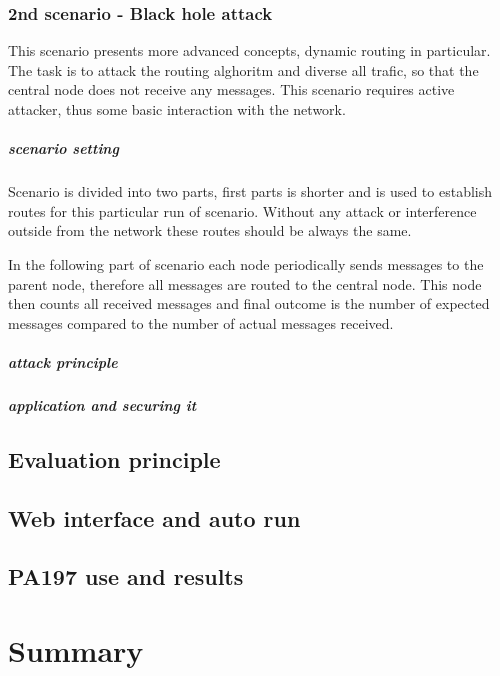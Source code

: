 \documentclass[
  digital, %
  table,   %
  nolof,     %
  nolot,     %
           oneside
]{fithesis3}
\begin{document}
    \subsection{2nd scenario - Black hole attack}
    This scenario presents more advanced concepts, dynamic routing in particular. The task is to attack the routing alghoritm and diverse all trafic, so that the central node does not receive any messages. This scenario requires active attacker, thus some basic interaction with the network.

    \paragraph{scenario setting}
    Scenario is divided into two parts, first parts is shorter and is used to establish routes for this particular run of scenario. Without any attack or interference outside from the network these routes should be always the same.

    In the following part of scenario each node periodically sends messages to the parent node, therefore all messages are routed to the central node. This node then counts all received messages and final outcome is the number of expected messages compared to the number of actual messages received. 

    \paragraph{attack principle}


    \paragraph{application and securing it}


  \section{Evaluation principle}\label{sec:eval}
  \section{Web interface and auto run}
  \section{PA197 use and results}
\chapter{Summary}
\end{document}

